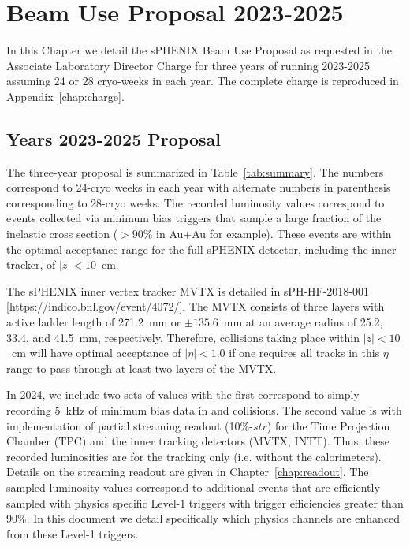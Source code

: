 \chapter{Beam Use Proposal 2023-2025}
\label{chap:beam_use_proposal}

In this Chapter we detail the sPHENIX Beam Use Proposal as requested in the Associate Laboratory Director Charge for three years of running 2023-2025 assuming 24 or 28 cryo-weeks in each year.  The complete charge is reproduced in Appendix~\ref{chap:charge}.   

\section{Years 2023-2025 Proposal}

The three-year proposal is summarized in Table~\ref{tab:summary}.   The numbers correspond to 24-cryo weeks in each year with alternate numbers in parenthesis corresponding to 28-cryo weeks.    The recorded luminosity values correspond to events collected via minimum bias triggers that sample a large fraction of the inelastic cross section ($> 90\%$ in Au+Au for example).    These events are within the optimal acceptance range for the full sPHENIX detector, including the inner tracker, of $|z|<10$~cm.    

The sPHENIX inner vertex tracker MVTX is detailed in sPH-HF-2018-001 [https://indico.bnl.gov/event/4072/].   The MVTX consists of three layers with active ladder length of 271.2~mm or $\pm135.6$~mm at an average radius of 25.2, 33.4, and 41.5~mm, respectively. Therefore, collisions taking place within $|z| < 10$~cm will have optimal acceptance of $|\eta| < 1.0$ if one requires all tracks in this $\eta$ range to pass through at least two layers of the MVTX.

In 2024, we include two sets of values with the first correspond to simply recording 5~kHz of minimum bias data in \pp and \pau collisions.   The second value is with implementation of partial streaming readout (10\%-$str$) for the Time Projection Chamber (TPC) and the inner tracking detectors (MVTX, INTT).    Thus, these recorded luminosities are for the tracking only (i.e. without the calorimeters).   Details on the streaming readout are given in Chapter~\ref{chap:readout}.
The sampled luminosity values correspond to additional events that are efficiently sampled with physics specific Level-1 triggers with trigger efficiencies greater than 90\%.    In this document we detail specifically which physics channels are enhanced from these Level-1 triggers.     

